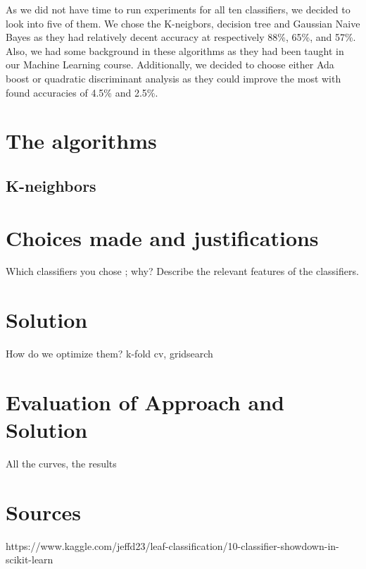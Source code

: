 \documentclass{article}
\begin{document}
As we did not have time to run experiments for all ten classifiers, we decided to look into five of them. We chose the K-neigbors, decision tree and Gaussian Naive Bayes as they had relatively decent accuracy at respectively 88\%, 65\%, and 57\%. Also, we had some background in these algorithms as they had been taught in our Machine Learning course. Additionally, we decided to choose either Ada boost or quadratic discriminant analysis as they could improve the most with found accuracies of 4.5\% and 2.5\%. 

\newpage
\section{The algorithms}

\subsection{K-neighbors}


\section{Choices made and justifications}
Which classifiers you chose ; why?  
Describe the relevant features of the classifiers.

\newpage

\newpage

\section{Solution}
How do we optimize them? k-fold cv, gridsearch
\newpage

\section{Evaluation of Approach and Solution} 
All the curves, the results

\newpage

\section{Sources}


https://www.kaggle.com/jeffd23/leaf-classification/10-classifier-showdown-in-scikit-learn
\end{document}

